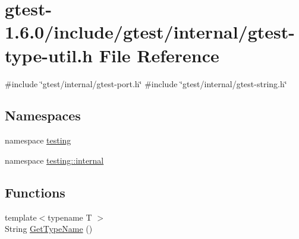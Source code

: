 \hypertarget{gtest-type-util_8h}{\section{gtest-\/1.6.0/include/gtest/internal/gtest-\/type-\/util.h \-File \-Reference}
\label{d9/d97/gtest-type-util_8h}
}
{\ttfamily \#include \char`\"{}gtest/internal/gtest-\/port.\-h\char`\"{}}\*
{\ttfamily \#include \char`\"{}gtest/internal/gtest-\/string.\-h\char`\"{}}\*
\subsection*{\-Namespaces}
\begin{DoxyCompactItemize}
\item 
namespace \hyperlink{namespacetesting}{testing}
\item 
namespace \hyperlink{namespacetesting_1_1internal}{testing\-::internal}
\end{DoxyCompactItemize}
\subsection*{\-Functions}
\begin{DoxyCompactItemize}
\item 
{\footnotesize template$<$typename T $>$ }\\\-String \hyperlink{namespacetesting_1_1internal_a8b5db836af4b8a8eaef9c27e7b7f0463}{\-Get\-Type\-Name} ()
\end{DoxyCompactItemize}
